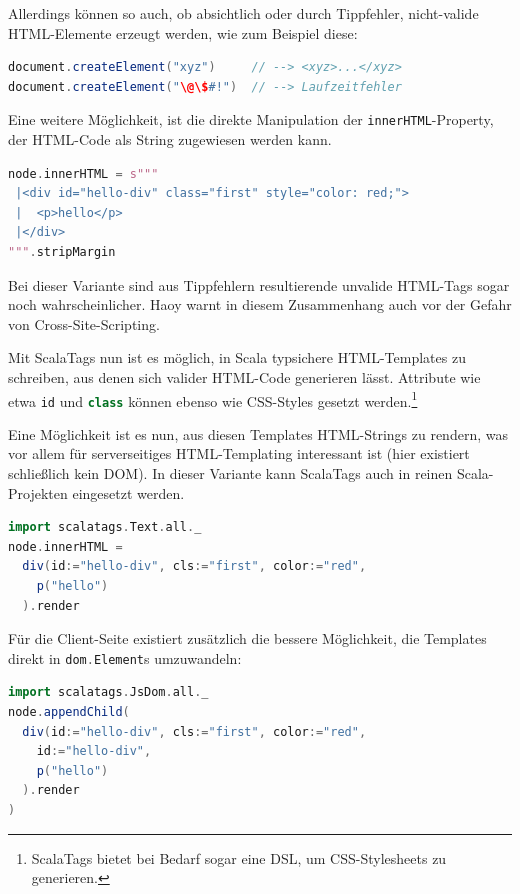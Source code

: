 \documentclass[a4paper, 12pt, hidelinks, listof=totoc, listoftables=totoc, bibliography=totoc]{scrreprt}
\newcommand{\code}[1]{\lstinline[language=Scala, style=inline]|#1|}
\newcommand{\scala}[1]{\lstinline[language=Scala, style=inline]|#1|}
\begin{document}
Allerdings können so auch, ob absichtlich oder durch Tippfehler, nicht-valide HTML-Elemente erzeugt werden, wie zum Beispiel diese:
\begin{lstlisting}[language=Scala, style=snippet]
document.createElement("xyz")     // --> <xyz>...</xyz>
document.createElement("\@\$#!")  // --> Laufzeitfehler
\end{lstlisting}

Eine weitere Möglichkeit, ist die direkte Manipulation der \code{innerHTML}-Property, der HTML-Code als String zugewiesen werden kann.

\begin{lstlisting}[language=Scala, caption={HTML-Generierung mit Scala-js-dom und Strings.}]
node.innerHTML = s"""
 |<div id="hello-div" class="first" style="color: red;">
 |  <p>hello</p>
 |</div>
""".stripMargin
\end{lstlisting}

Bei dieser Variante sind aus Tippfehlern resultierende unvalide HTML-Tags sogar noch wahrscheinlicher. Haoy warnt in diesem Zusammenhang auch vor der Gefahr von Cross-Site-Scripting.\cite[\#HelloWorld:HTML]{haoyi.HOS}

Mit ScalaTags nun ist es möglich, in Scala typsichere HTML-Templates zu schreiben, aus denen sich valider HTML-Code generieren lässt. Attribute wie etwa \code{id} und \code{class} können ebenso wie CSS-Styles gesetzt werden.\footnote{ScalaTags bietet bei Bedarf sogar eine DSL, um CSS-Stylesheets zu generieren.}

Eine Möglichkeit ist es nun, aus diesen Templates HTML-Strings zu rendern, was vor allem für serverseitiges HTML-Templating interessant ist (hier existiert schließlich kein DOM). In dieser Variante kann ScalaTags auch in reinen Scala-Projekten eingesetzt werden.

\begin{lstlisting}[language=Scala, caption={HTML-Generierung mit ScalaTags und Strings.}]
import scalatags.Text.all._
node.innerHTML =
  div(id:="hello-div", cls:="first", color:="red",
    p("hello")
  ).render
\end{lstlisting}

Für die Client-Seite existiert zusätzlich die bessere Möglichkeit, die Templates direkt in \scala{dom.Element}s umzuwandeln:

\begin{lstlisting}[language=Scala, caption={HTML-Generierung mit ScalaTags und Nodes.}]
import scalatags.JsDom.all._
node.appendChild(
  div(id:="hello-div", cls:="first", color:="red",
    id:="hello-div",
    p("hello")
  ).render
)
\end{lstlisting}
\end{document}
